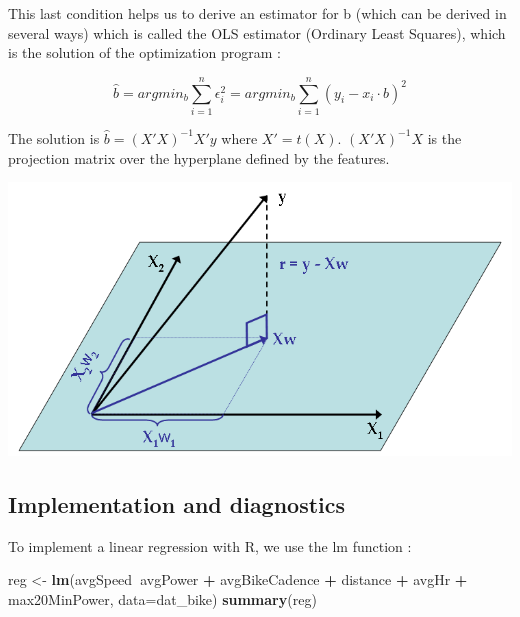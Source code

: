 \documentclass[
]{book}
\newenvironment{Shaded}{\begin{snugshade}}{\end{snugshade}}
\newcommand{\DataTypeTok}[1]{\textcolor[rgb]{0.13,0.29,0.53}{#1}}
\newcommand{\KeywordTok}[1]{\textcolor[rgb]{0.13,0.29,0.53}{\textbf{#1}}}
\newcommand{\NormalTok}[1]{#1}
\newcommand{\OperatorTok}[1]{\textcolor[rgb]{0.81,0.36,0.00}{\textbf{#1}}}
\newcommand{\StringTok}[1]{\textcolor[rgb]{0.31,0.60,0.02}{#1}}
\begin{document}
This last condition helps us to derive an estimator for b (which can be derived in several ways) which is called the OLS estimator (Ordinary Least Squares), which is the solution of the optimization program :

\[\hat{b}=argmin_b \sum_{i=1}^n \epsilon_i^2 = argmin_b \sum_{i=1}^n (y_i-x_i \cdot b)^2\]

The solution is \(\hat{b} = (X'X)^{-1}X'y\) where \(X'=t(X)\). \((X'X)^{-1}X\) is the projection matrix over the hyperplane defined by the features.

\includegraphics{img/ols-regression-geometry.png}

\hypertarget{implementation-and-diagnostics}{%
\subsection{Implementation and diagnostics}\label{implementation-and-diagnostics}}

To implement a linear regression with R, we use the lm function :

\begin{Shaded}
\begin{Highlighting}[]
\NormalTok{reg <-}\StringTok{ }\KeywordTok{lm}\NormalTok{(avgSpeed}\OperatorTok{~}\NormalTok{avgPower }\OperatorTok{+}\StringTok{ }\NormalTok{avgBikeCadence }\OperatorTok{+}\StringTok{ }\NormalTok{distance }\OperatorTok{+}\StringTok{ }\NormalTok{avgHr }\OperatorTok{+}\StringTok{ }\NormalTok{max20MinPower, }\DataTypeTok{data=}\NormalTok{dat_bike)}
\KeywordTok{summary}\NormalTok{(reg)}
\end{Highlighting}
\end{Shaded}
\end{document}
